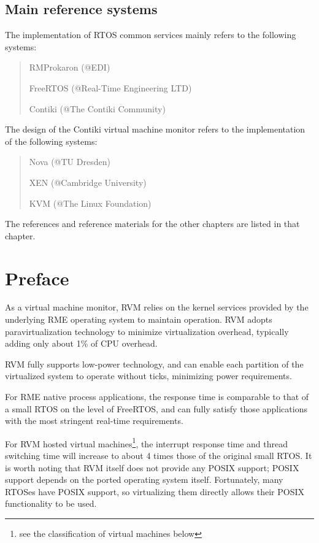 \subsection{Main reference systems}\label{subsec:1-1-3}

The implementation of RTOS common services mainly refers to the following systems:

\begin{quote}
RMProkaron (@EDI)

FreeRTOS (@Real-Time Engineering LTD)

Contiki (@The Contiki Community)
\end{quote}

The design of the Contiki virtual machine monitor refers to the implementation of the following systems:

\begin{quote}
Nova (@TU Dresden)

XEN (@Cambridge University)

KVM (@The Linux Foundation)
\end{quote}

The references and reference materials for the other chapters are listed in that chapter.

\section{Preface}\label{sec:1-2}

As a virtual machine monitor, RVM relies on the kernel services provided by the underlying RME operating system to maintain operation. RVM adopts paravirtualization technology to minimize virtualization overhead, typically adding only about 1\% of CPU overhead.

RVM fully supports low-power technology, and can enable each partition of the virtualized system to operate without ticks, minimizing power requirements.

For RME native process applications, the response time is comparable to that of a small RTOS on the level of FreeRTOS, and can fully satisfy those applications with the most stringent real-time requirements.

For RVM hosted virtual machines\footnote{see the classification of virtual machines below}, the interrupt response time and thread switching time will increase to about 4 times those of the original small RTOS. It is worth noting that RVM itself does not provide any POSIX support; POSIX support depends on the ported operating system itself. Fortunately, many RTOSes have POSIX support, so virtualizing them directly allows their POSIX functionality to be used.

